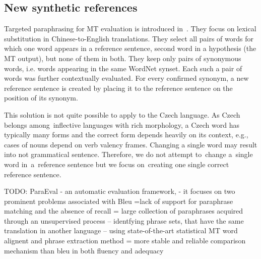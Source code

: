 \documentclass[11pt]{article}
\begin{document}
\subsection{New synthetic references}

Targeted paraphrasing for MT evaluation is introduced in~. They 
focus on lexical substitution in Chinese-to-English translations.  They select 
all pairs of words for which one word appears in a reference sentence, second 
word in a hypothesis (the MT output), but none of them in both. They keep only 
pairs of synonymous words, i.e. words appearing in the same WordNet 
\cite{wordnet} synset. Each such a pair of words was further contextually 
evaluated. For every confirmed synonym, a new reference sentence is created by 
placing it to the reference sentence on the position of its synonym.

% 

This solution is not quite possible to apply to the Czech language. As Czech 
belongs among~inflective languages with rich morphology, a Czech word has 
typically many forms and the correct form depends heavily on its context, 
e.g., cases of nouns depend on verb valency frames. Changing a single word may 
result into not grammatical sentence. Therefore, we do not attempt to~change 
a~single word in~a~reference sentence but we focus on~creating one single 
correct reference sentence.


TODO:
\cite{Zhou:2006}
ParaEval - an automatic evaluation framework, 
- it focuses on two prominent problems associated with Bleu =lack of support for paraphrase
matching and the absence of recall
= large  collection of paraphrases acquired through an unsupervised process -- identfying
phrase sets, that have the same translation in another language -- using state-of-the-art
statistical MT word alignent and phrase extraction method
= more stable and reliable comparison mechanism than bleu in both fluency and adequacy
\end{document}
